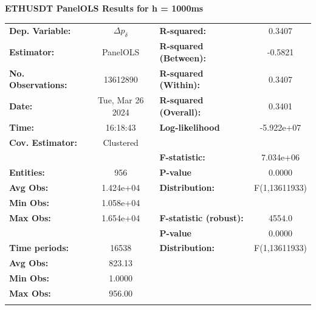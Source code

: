 \documentclass[a4paper, oneside, notitlepage]{book}
\begin{document}
\begin{table}
\textbf{ETHUSDT PanelOLS Results for h = 1000ms}
\begin{center}
\begin{tabular}{lclc}
\hline
\textbf{Dep. Variable:}    &         $\Delta p_{\delta}$         & \textbf{  R-squared:         }   &      0.3407      \\
\textbf{Estimator:}        &      PanelOLS      & \textbf{  R-squared (Between):}  &     -0.5821      \\
\textbf{No. Observations:} &      13612890      & \textbf{  R-squared (Within):}   &      0.3407      \\
\textbf{Date:}             &  Tue, Mar 26 2024  & \textbf{  R-squared (Overall):}  &      0.3401      \\
\textbf{Time:}             &      16:18:43      & \textbf{  Log-likelihood     }   &    -5.922e+07    \\
\textbf{Cov. Estimator:}   &     Clustered      & \textbf{                     }   &                  \\
\textbf{}                  &                    & \textbf{  F-statistic:       }   &    7.034e+06     \\
\textbf{Entities:}         &        956         & \textbf{  P-value            }   &      0.0000      \\
\textbf{Avg Obs:}          &     1.424e+04      & \textbf{  Distribution:      }   &  F(1,13611933)   \\
\textbf{Min Obs:}          &     1.058e+04      & \textbf{                     }   &                  \\
\textbf{Max Obs:}          &     1.654e+04      & \textbf{  F-statistic (robust):} &      4554.0      \\
\textbf{}                  &                    & \textbf{  P-value            }   &      0.0000      \\
\textbf{Time periods:}     &       16538        & \textbf{  Distribution:      }   &  F(1,13611933)   \\
\textbf{Avg Obs:}          &       823.13       & \textbf{                     }   &                  \\
\textbf{Min Obs:}          &       1.0000       & \textbf{                     }   &                  \\
\textbf{Max Obs:}          &       956.00       & \textbf{                     }   &                  \\
\textbf{}                  &                    & \textbf{                     }   &                  \\

\end{tabular}
\end{center}
\end{table}
\end{document}
